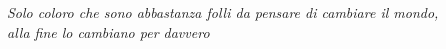 \documentclass[11pt]{toptesi}
\begin{document}
\frontespizio




\frontmatter

 \begin{flushright}
 \noindent
  
 \end{flushright}
\cleardoublepage


\begin{flushright}
\noindent
\textit{Solo coloro che sono abbastanza folli da pensare di cambiare il mondo,\\ alla fine lo cambiano per davvero}

\textit{}
\end{flushright}
\cleardoublepage
{}
\begin{flushright}
	\noindent
	\textit{}
\end{flushright}
\cleardoublepage



\end{document}
